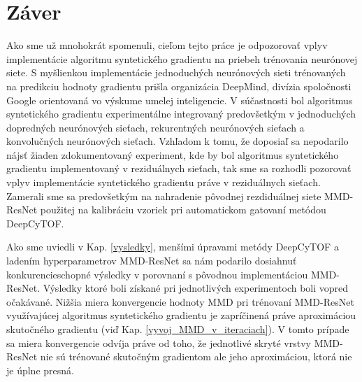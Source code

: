 \chapter*{Záver}  %

Ako sme už mnohokrát spomenuli, cieľom tejto práce je odpozorovať vplyv implementácie algoritmu syntetického gradientu na priebeh trénovania neurónovej siete. S myšlienkou implementácie jednoduchých neurónových sieti trénovaných na predikciu hodnoty gradientu prišla organizácia DeepMind, divízia spoločnosti Google orientovaná vo výskume umelej inteligencie. V súčastnosti bol algoritmus syntetického gradientu experimentálne integrovaný predovšetkým v jednoduchých dopredných neurónových sieťach, rekurentných neurónových sieťach a konvolučných neurónových sieťach. Vzhľadom k tomu, že doposiaľ sa nepodarilo nájsť žiaden zdokumentovaný experiment, kde by bol algoritmus syntetického gradientu implementovaný v reziduálnych sieťach, tak sme sa rozhodli pozorovať vplyv implementácie syntetického gradientu práve v reziduálnych sieťach. Zamerali sme sa predovšetkým na nahradenie pôvodnej rezdiduálnej siete MMD-ResNet použitej na kalibráciu vzoriek pri automatickom gatovaní metódou DeepCyTOF.

Ako sme uviedli v Kap. \ref{vysledky}, menšími úpravami metódy DeepCyTOF a ladením hyperparametrov MMD-ResNet sa nám podarilo dosiahnuť konkurencieschopné výsledky v porovnaní s pôvodnou implementáciou MMD-ResNet. Výsledky ktoré boli získané pri jednotlivých experimentoch boli vopred očakávané. Nižšia miera konvergencie hodnoty MMD pri trénovaní MMD-ResNet využívajúcej algoritmus syntetického gradientu je zapríčinená práve aproximáciou skutočného gradientu (viď Kap. \ref{vyvoj_MMD_v_iteraciach}). V tomto prípade sa miera konvergencie odvíja práve od toho, že jednotlivé skryté vrstvy MMD-ResNet nie sú trénované skutočným gradientom ale jeho aproximáciou, ktorá nie je úplne presná. 

